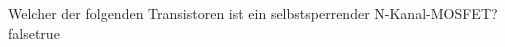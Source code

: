     {Welcher der folgenden Transistoren ist ein selbstsperrender N-Kanal-MOSFET?}
    {}
    {}
    {}
    {}
    {false}{true}